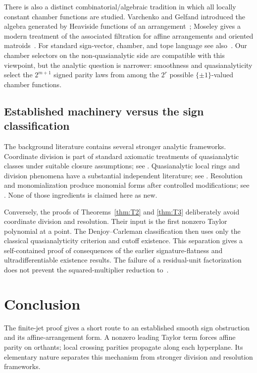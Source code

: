 \documentclass[11pt]{article}
\theoremstyle{definition}
\theoremstyle{remark}
\begin{document}
There is also a distinct combinatorial/algebraic tradition in which all locally constant chamber functions are studied. Varchenko and Gelfand introduced the algebra generated by Heaviside functions of an arrangement~\cite{VarchenkoGelfand1987}; Moseley gives a modern treatment of the associated filtration for affine arrangements and oriented matroids~\cite{Moseley2017}. For standard sign-vector, chamber, and tope language see also~\cite{BjornerEtAl1999}. Our chamber selectors on the non-quasianalytic side are compatible with this viewpoint, but the analytic question is narrower: smoothness and quasianalyticity select the $2^{m+1}$ signed parity laws from among the $2^r$ possible $\{\pm1\}$-valued chamber functions.

\subsection{Established machinery versus the sign classification}

The background literature contains several stronger analytic frameworks. Coordinate division is part of standard axiomatic treatments of quasianalytic classes under suitable closure assumptions; see \cite{BelottoBierstoneChow2018}. Quasianalytic local rings and division phenomena have a substantial independent literature; see \cite{Thilliez2008}. Resolution and monomialization produce monomial forms after controlled modifications; see \cite{BierstoneMilman2004,BelottoBierstone2023}. None of those ingredients is claimed here as new.

Conversely, the proofs of Theorems~\ref{thm:T2} and \ref{thm:T3} deliberately avoid coordinate division and resolution. Their input is the first nonzero Taylor polynomial at a point. The Denjoy--Carleman classification then uses only the classical quasianalyticity criterion and cutoff existence. This separation gives a self-contained proof of consequences of the earlier signature-flatness and ultradifferentiable existence results. The failure of a residual-unit factorization does not prevent the squared-multiplier reduction to~\cite{BrogliaTognoli1989}.

\section{Conclusion}

The finite-jet proof gives a short route to an established smooth sign obstruction and its affine-arrangement form. A nonzero leading Taylor term forces affine parity on orthants; local crossing parities propagate along each hyperplane. Its elementary nature separates this mechanism from stronger division and resolution frameworks.
\end{document}
